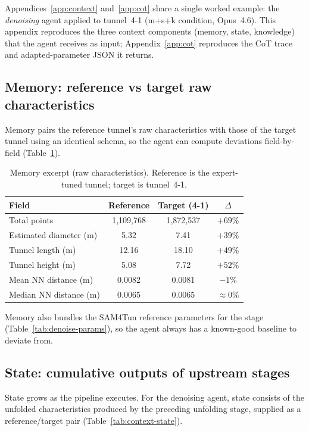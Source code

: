 Appendices~\ref{app:context} and~\ref{app:cot} share a single worked example: the \emph{denoising} agent applied to tunnel~4-1 (m+s+k condition, Opus~4.6). This appendix reproduces the three context components (memory, state, knowledge) that the agent receives as input; Appendix~\ref{app:cot} reproduces the CoT trace and adapted-parameter JSON it returns.

\subsection{Memory: reference vs target raw characteristics}\label{app:context-memory}
Memory pairs the reference tunnel's raw characteristics with those of the target tunnel using an identical schema, so the agent can compute deviations field-by-field (Table~\ref{tab:context-memory}).

\begin{table}[ht]
\caption{Memory excerpt (raw characteristics). Reference is the expert-tuned tunnel; target is tunnel~4-1.}\label{tab:context-memory}
\begin{tabular*}{\tblwidth}{@{} l c c c @{}}
\toprule
Field & Reference & Target (4-1) & $\Delta$ \\
\midrule
Total points & 1{,}109{,}768 & 1{,}872{,}537 & $+69\%$ \\
Estimated diameter (m) & 5.32 & 7.41 & $+39\%$ \\
Tunnel length (m) & 12.16 & 18.10 & $+49\%$ \\
Tunnel height (m) & 5.08 & 7.72 & $+52\%$ \\
Mean NN distance (m) & 0.0082 & 0.0081 & $-1\%$ \\
Median NN distance (m) & 0.0065 & 0.0065 & $\approx 0\%$ \\
\bottomrule
\end{tabular*}
\end{table}

Memory also bundles the SAM4Tun reference parameters for the stage (Table~\ref{tab:denoise-params}), so the agent always has a known-good baseline to deviate from.

\subsection{State: cumulative outputs of upstream stages}\label{app:context-state}
State grows as the pipeline executes. For the denoising agent, state consists of the unfolded characteristics produced by the preceding unfolding stage, supplied as a reference/target pair (Table~\ref{tab:context-state}).

